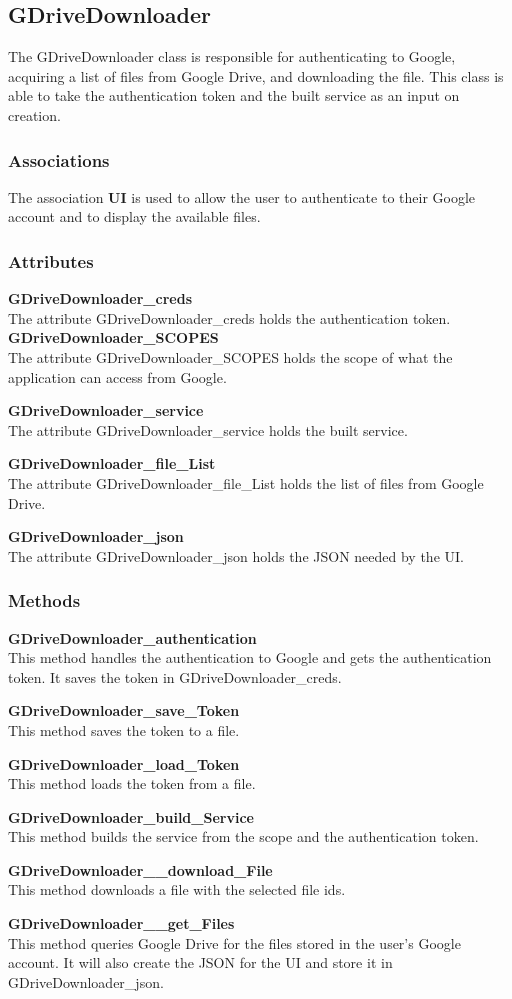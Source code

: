 \subsection{GDriveDownloader}
The GDriveDownloader class is responsible for authenticating to Google, acquiring a list of files from Google Drive, and downloading the file.
This class is able to take the authentication token and the built service as an input on creation.  
\subsubsection{Associations}
The association \textbf{UI} is used to allow the user to authenticate to their Google account and to display the available files.
\subsubsection{Attributes}
\textbf{GDriveDownloader\_creds} \\
The attribute GDriveDownloader\_creds holds the authentication token.
\textbf{GDriveDownloader\_SCOPES} \\
The attribute GDriveDownloader\_SCOPES holds the scope of what the application can access from Google.

\textbf{GDriveDownloader\_service} \\
The attribute GDriveDownloader\_service holds the built service.

\textbf{GDriveDownloader\_file\_List} \\
The attribute GDriveDownloader\_file\_List holds the list of files from Google Drive.

\textbf{GDriveDownloader\_json} \\
The attribute GDriveDownloader\_json holds the JSON needed by the UI. 
\subsubsection{Methods}
\textbf{GDriveDownloader\_authentication} \\
This method handles the authentication to Google and gets the authentication token. It saves the token in GDriveDownloader\_creds.

\textbf{GDriveDownloader\_save\_Token} \\
This method saves the token to a file.

\textbf{GDriveDownloader\_load\_Token} \\
This method loads the token from a file.

\textbf{GDriveDownloader\_build\_Service} \\
This method builds the service from the scope and the authentication token.

\textbf{GDriveDownloader\_\_download\_File} \\
This method downloads a file with the selected file ids. 

\textbf{GDriveDownloader\_\_get\_Files} \\
This method queries Google Drive for the files stored in the user's Google account. It will also create the JSON for the UI and store it in GDriveDownloader\_json.   
